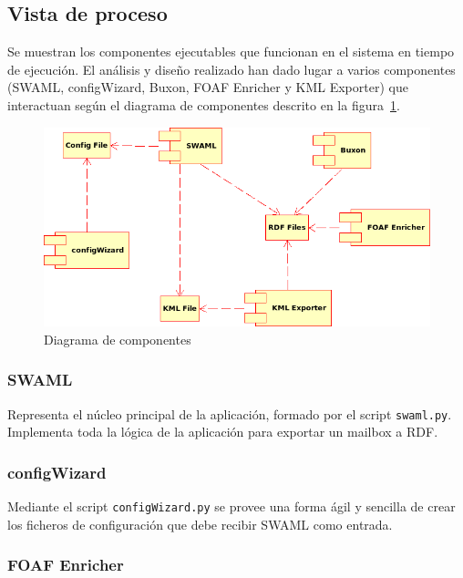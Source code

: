 
\subsection{Vista de proceso}

Se muestran los componentes ejecutables que funcionan en el sistema en 
tiempo de ejecución. El análisis y diseño realizado han dado lugar a 
varios componentes (SWAML, configWizard, Buxon, FOAF Enricher y 
KML Exporter) que interactuan según el diagrama de componentes descrito 
en la figura~\ref{fig:uml:componentes}.

\begin{figure}[H]
	\centering
	\includegraphics[width=15cm]{images/uml/componentes.png}
	\caption{Diagrama de componentes}
	\label{fig:uml:componentes}
\end{figure}

\subsubsection{SWAML}

Representa el núcleo principal de la aplicación, formado por el script
\texttt{swaml.py}. Implementa toda la lógica de la aplicación para
exportar un mailbox a RDF.

\subsubsection{configWizard}

Mediante el script \texttt{configWizard.py} se provee una forma ágil y 
sencilla de crear los ficheros de configuración que debe recibir SWAML 
como entrada.

\subsubsection{FOAF Enricher}

